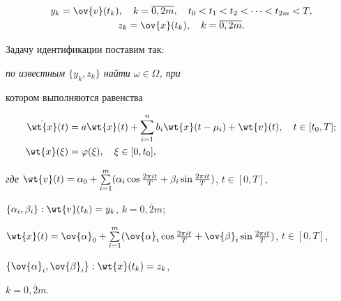 \begin{exam}
\begin{gather}


y_k=\ov{v}(t_k), \quad k=\overline{0,2m}, \quad t_0<t_1<t_2<


\dotsb <t_{2m}<T, \\


z_k=\ov{x}(t_k), \quad k=\overline{0,2m}.


\end{gather}


Задачу идентификации поставим так:


{\it по известным $\{y_k,z_k\}$ найти $\omega\in\Omega$, при


котором выполняются равенства}


\begin{equation}


\begin{split}


\Dot{\wt{x}}(t)&=a\wt{x}(t) +


\sum\limits^n_{i=1}b_i\wt{x}(t-\mu_i) + \wt{v}(t), \quad


t\in[t_0,T];\\


\wt{x}(\xi)&=\varphi(\xi), \quad \xi\in[0,t_0],


\end{split}


\end{equation}


{\it где} $\wt{v}(t)=\alpha_0 +


\sum\limits^m_{i=1}(\alpha_i\cos\frac{2\pi it}{T} +


\beta_i\sin\frac{2\pi it}{T})$, $t\in[0,T]$,


$\{\alpha_i,\beta_i\}:\wt{v}(t_k) = y_k$, $k=\overline{0,2m};$\linebreak


$\wt{x}(t) = \ov{\alpha}_0 +


\sum\limits^m_{i=1}(\ov{\alpha}_i\cos\frac{2\pi


it}{T} + \ov{\beta}_i\sin\frac{2\pi it}{T})$, $t\in[0,T]$,


$\{\ov{\alpha}_i,\ov{\beta}_i\}: \wt{x}(t_k) = z_k$,


$k=\overline{0,2m}$.


\end{exam}





